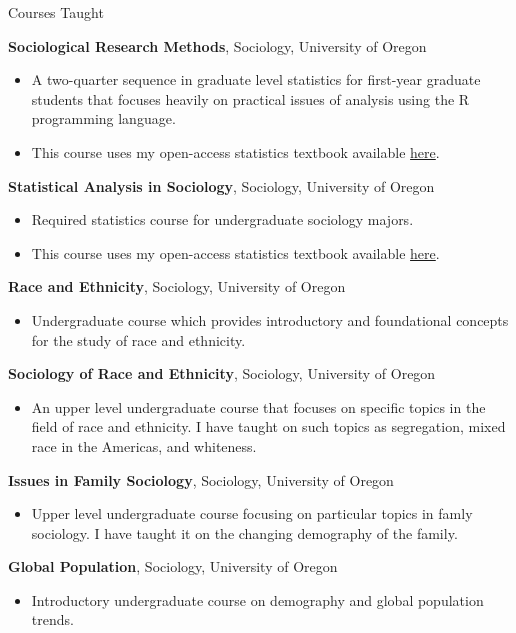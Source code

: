 \begin{rubric}{Courses Taught}

\entry*[] \textbf{Sociological Research Methods}, Sociology, University of Oregon  \begin{itemize}
\item A two-quarter sequence in graduate level statistics for first-year graduate students that focuses heavily on practical issues of analysis using the R programming language.

\item This course uses my open-access statistics textbook available \href{https://stat-analysis.netlify.app}{here}.

\end{itemize}
\entry*[] \textbf{Statistical Analysis in Sociology}, Sociology, University of Oregon  \begin{itemize}
\item Required statistics course for undergraduate sociology majors.

\item This course uses my open-access statistics textbook available \href{https://stat-analysis.netlify.app}{here}.

\end{itemize}
\entry*[] \textbf{Race and Ethnicity}, Sociology, University of Oregon  \begin{itemize}
\item Undergraduate course which provides introductory and foundational concepts for the study of race and ethnicity.

\end{itemize}
\entry*[] \textbf{Sociology of Race and Ethnicity}, Sociology, University of Oregon  \begin{itemize}
\item An upper level undergraduate course that focuses on specific topics in the field of race and ethnicity. I have taught on such topics as segregation, mixed race in the Americas, and whiteness.

\end{itemize}
\entry*[] \textbf{Issues in Family Sociology}, Sociology, University of Oregon  \begin{itemize}
\item Upper level undergraduate course focusing on particular topics in famly sociology. I have taught it on the changing demography of the family.

\end{itemize}
\entry*[] \textbf{Global Population}, Sociology, University of Oregon  \begin{itemize}
\item Introductory undergraduate course on demography and global population trends.

\end{itemize}

\end{rubric}